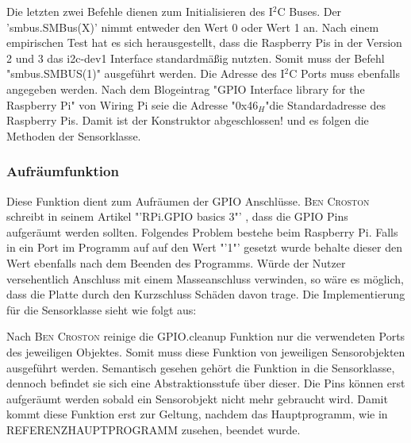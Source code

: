 	Die letzten zwei Befehle dienen zum Initialisieren des I$^2$C Buses. Der 'smbus.SMBus(X)' nimmt entweder den Wert 0 oder Wert 1 an. Nach einem empirischen Test hat es sich herausgestellt, dass die Raspberry Pis in der Version 2 und 3 das i2c-dev1 Interface standardmäßig nutzten. Somit muss der Befehl "smbus.SMBUS(1)" ausgeführt werden. Die Adresse des I$^2$C Ports muss ebenfalls angegeben werden. Nach dem Blogeintrag "GPIO Interface library for the Raspberry Pi"\cite{I2CPCF8592:online} von Wiring Pi seie die Adresse "0x46$_H$"\space die Standardadresse des Raspberry Pis. Damit ist der Konstruktor abgeschlossen! und es folgen die Methoden der Sensorklasse.
\subsubsection*{Aufräumfunktion}
	Diese Funktion dient zum Aufräumen der \ac{GPIO} Anschlüsse. \textsc{Ben Croston} schreibt in seinem Artikel "'RPi.GPIO basics 3"' \cite{RPiGPIOb90:online}, dass die \ac{GPIO} Pins aufgeräumt werden sollten. Folgendes Problem bestehe beim Raspberry Pi. Falls in ein Port im Programm auf auf den Wert "'1"' gesetzt wurde behalte dieser den Wert ebenfalls nach dem Beenden des Programms. Würde der Nutzer versehentlich Anschluss mit einem Masseanschluss verwinden, so wäre es möglich, dass die Platte durch den Kurzschluss Schäden davon trage. Die Implementierung für die Sensorklasse sieht wie folgt aus:
	
	Nach \textsc{Ben Croston} \cite{RPiGPIOb90:online} reinige die GPIO.cleanup Funktion nur die verwendeten Ports des jeweiligen Objektes. Somit muss diese Funktion von jeweiligen Sensorobjekten ausgeführt werden. Semantisch gesehen gehört die Funktion in die Sensorklasse, dennoch befindet sie sich eine Abstraktionsstufe über dieser. Die Pins können erst aufgeräumt werden sobald ein Sensorobjekt nicht mehr gebraucht wird. Damit kommt diese Funktion erst zur Geltung, nachdem das Hauptprogramm, wie in REFERENZHAUPTPROGRAMM zusehen,
	beendet wurde.
